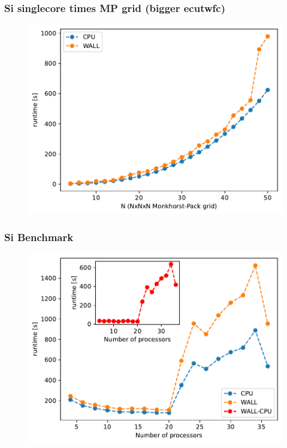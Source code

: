 \documentclass{beamer}
\begin{document}
\begin{frame}
    \frametitle{Si singlecore times MP grid (bigger ecutwfc)}
    \begin{figure}
        \includegraphics[width=\linewidth, height=\textheight,keepaspectratio]{si_bench_singlecore_kpoints_max_ecut.pdf}
    \end{figure}
\end{frame}

\begin{frame}
    \frametitle{Si Benchmark}
    \begin{figure}
        \includegraphics[width=\linewidth, height=\textheight,keepaspectratio]{si_bench_nprocs.pdf}
    \end{figure}
\end{frame}
\end{document}
